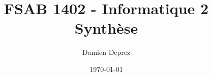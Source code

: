 \documentclass[12pt,a4paper,twoside]{report}
\begin{document}
\makeatletter

\author{Damien Deprez}
\title{FSAB 1402 - Informatique 2\\Synthèse}
\date{\today}
\titre{\@title}{\@author}{\@date}{}{}

\tableofcontents
\end{document}
